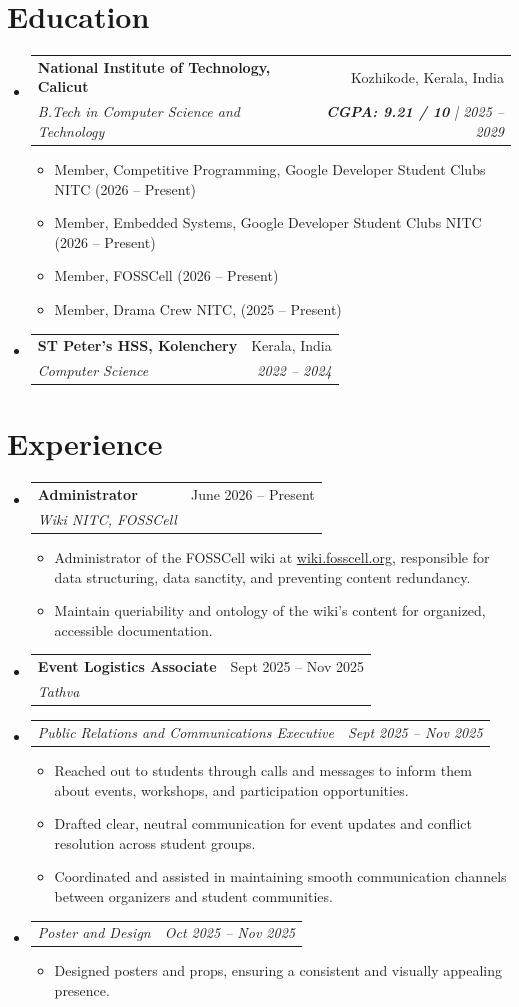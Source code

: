 \documentclass[letterpaper,11pt]{article}
\makeatletter
\newcommand{\resumeItem}[1]{
  \item\small{
    {#1 \vspace{-2pt}}
  }
}
\newcommand{\resumeSubheading}[4]{
  \vspace{-2pt}\item
    \begin{tabular*}{0.97\textwidth}[t]{l@{\extracolsep{\fill}}r}
      \textbf{#1} & #2 \\
      \textit{\small#3} & \textit{\small #4} \\
    \end{tabular*}\vspace{-7pt}
}
\newcommand{\resumeSubSubheading}[2]{
    \item
    \begin{tabular*}{0.97\textwidth}{l@{\extracolsep{\fill}}r}
      \textit{\small#1} & \textit{\small #2} \\
    \end{tabular*}\vspace{-7pt}
}
\newcommand{\resumeSubHeadingListStart}{\begin{itemize}[leftmargin=0.15in, label={}]}
\newcommand{\resumeSubHeadingListEnd}{\end{itemize}}
\newcommand{\resumeItemListStart}{\begin{itemize}}
\newcommand{\resumeItemListEnd}{\end{itemize}\vspace{-5pt}}
\makeatother
\begin{document}
\section{Education}
  \resumeSubHeadingListStart
    \resumeSubheading
      {National Institute of Technology, Calicut}{Kozhikode, Kerala, India}
      {B.Tech in Computer Science and Technology}{\textbf {CGPA: 9.21 / 10 } | \hspace{5pt}2025 -- 2029}
    \resumeItemListStart
      \resumeItem{Member, Competitive Programming, Google Developer Student Clubs NITC (2026 -- Present)}
      \resumeItem{Member, Embedded Systems, Google Developer Student Clubs NITC (2026 -- Present)}
      \resumeItem{Member, FOSSCell (2026 -- Present)}
      \resumeItem{Member, Drama Crew NITC, (2025 -- Present)}
    \resumeItemListEnd
    \resumeSubheading
      {ST Peter's HSS, Kolenchery}{Kerala, India}
      {Computer Science}{2022 -- 2024}
  \resumeSubHeadingListEnd


\section{Experience}
  \resumeSubHeadingListStart

    \resumeSubheading
      {Administrator}{June 2026 -- Present}
      {Wiki NITC, FOSSCell}{}
      \resumeItemListStart
        \resumeItem{Administrator of the FOSSCell wiki at \href{https://wiki.fosscell.org}{wiki.fosscell.org}, responsible for data structuring, data sanctity, and preventing content redundancy.}
        \resumeItem{Maintain queriability and ontology of the wiki's content for organized, accessible documentation.}
      \resumeItemListEnd

    \resumeSubheading
      {Event Logistics Associate}{Sept 2025 -- Nov 2025}
      {Tathva}{}
      \resumeSubSubheading{Public Relations and Communications Executive}{Sept 2025 -- Nov 2025}
      \resumeItemListStart
        \resumeItem{Reached out to students through calls and messages to inform them about events, workshops, and participation opportunities.}
        \resumeItem{Drafted clear, neutral communication for event updates and conflict resolution across student groups.}
        \resumeItem{Coordinated and assisted in maintaining smooth communication channels between organizers and student communities.}
      \resumeItemListEnd
      \resumeSubSubheading{Poster and Design}{Oct 2025 -- Nov 2025}
      \resumeItemListStart
        \resumeItem{Designed posters and props, ensuring a consistent and visually appealing presence.}
      \resumeItemListEnd
  \resumeSubHeadingListEnd
\end{document}
